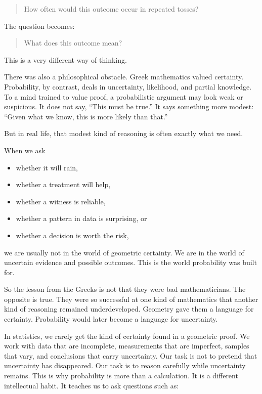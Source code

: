 \documentclass[
  letterpaper,
  DIV=11,
  numbers=noendperiod]{scrreprt}
\providecommand{\tightlist}{%
  \setlength{\itemsep}{0pt}\setlength{\parskip}{0pt}}
\begin{document}
\begin{quote}
How often would this outcome occur in repeated tosses?
\end{quote}

The question becomes:

\begin{quote}
What does this outcome mean?
\end{quote}

This is a very different way of thinking.

There was also a philosophical obstacle. Greek mathematics valued
certainty. Probability, by contrast, deals in uncertainty, likelihood,
and partial knowledge. To a mind trained to value proof, a probabilistic
argument may look weak or suspicious. It does not say, ``This must be
true.'' It says something more modest: ``Given what we know, this is
more likely than that.''

But in real life, that modest kind of reasoning is often exactly what we
need.

When we ask

\begin{itemize}
\tightlist
\item
  whether it will rain,
\item
  whether a treatment will help,
\item
  whether a witness is reliable,
\item
  whether a pattern in data is surprising, or
\item
  whether a decision is worth the risk,
\end{itemize}

we are usually not in the world of geometric certainty. We are in the
world of uncertain evidence and possible outcomes. This is the world
probability was built for.

So the lesson from the Greeks is not that they were bad mathematicians.
The opposite is true. They were so successful at one kind of mathematics
that another kind of reasoning remained underdeveloped. Geometry gave
them a language for certainty. Probability would later become a language
for uncertainty.

In statistics, we rarely get the kind of certainty found in a geometric
proof. We work with data that are incomplete, measurements that are
imperfect, samples that vary, and conclusions that carry uncertainty.
Our task is not to pretend that uncertainty has disappeared. Our task is
to reason carefully while uncertainty remains. This is why probability
is more than a calculation. It is a different intellectual habit. It
teaches us to ask questions such as:
\end{document}
